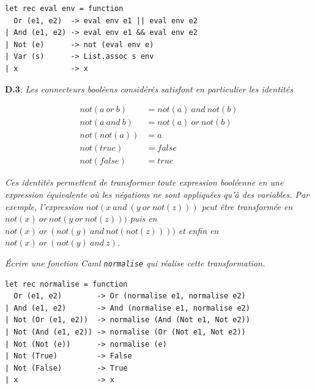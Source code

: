 \documentclass[11pt, a4paper]{article}
\begin{document}
\smallskip

\begin{verbatim}
let rec eval env = function
  Or (e1, e2)  -> eval env e1 || eval env e2
| And (e1, e2) -> eval env e1 && eval env e2
| Not (e)      -> not (eval env e)
| Var (s)      -> List.assoc s env
| x            -> x
\end{verbatim}

\smallskip

\noindent
\textbf{D.3}: \emph{Les connecteurs booléens considérés
satisfont en particulier les identités}

\begin{align*}
not(a ~or~ b)  & = not(a) ~and~ not(b)\\
not(a~ and~ b) & = not(a)~ or~ not(b)\\
not(not(a))    & = a\\
not(true)      & = false\\
not(false)     & = true
\end{align*}

\noindent
\emph{Ces identités permettent de transformer toute expression
booléenne en une expression équivalente où les négations ne
sont appliquées qu'à des variables. Par exemple, l'expression
$not(x ~and~ (y~ or~ not(z)))$ peut être transformée en $not(x)
~or~ not(y ~or ~not(z)))$ puis en $not(x) ~or~ (not(y)~ and
~not(not(z))))$ et enfin en $not(x) ~or~ (not(y) ~and~ z)$.}

\noindent
\emph{Écrire une fonction Caml \texttt{normalise} qui réalise cette
transformation.}

\smallskip

\begin{verbatim}
let rec normalise = function
  Or (e1, e2)        -> Or (normalise e1, normalise e2)
| And (e1, e2)       -> And (normalise e1, normalise e2)
| Not (Or (e1, e2))  -> normalise (And (Not e1, Not e2))
| Not (And (e1, e2)) -> normalise (Or (Not e1, Not e2))
| Not (Not (e))      -> normalise (e)
| Not (True)         -> False
| Not (False)        -> True
| x                  -> x
\end{verbatim}
\end{document}
